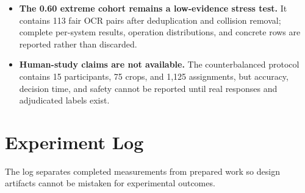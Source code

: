 \documentclass[11pt,a4paper]{article}
\begin{document}
\begin{itemize}
        image is linked to any of the 464 OCR pairs, and both new top-20
        recoveries are P0/P1 cases. Candidate recovery is measured; target
        validity is not yet adjudicated.
  \item \textbf{The 0.60 extreme cohort remains a low-evidence stress test.}
        It contains 113 fair OCR pairs after deduplication and collision
        removal; complete per-system results, operation distributions, and
        concrete rows are reported rather than discarded.
  \item \textbf{Human-study claims are not available.} The counterbalanced
        protocol contains 15 participants, 75 crops, and 1,125 assignments,
        but accuracy, decision time, and safety cannot be reported until real
        responses and adjudicated labels exist.
\end{itemize}

\section{Experiment Log}

The log separates completed measurements from prepared work so design artifacts
cannot be mistaken for experimental outcomes.
\end{document}
